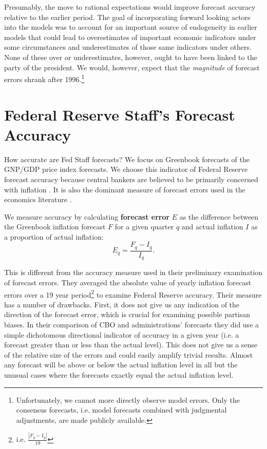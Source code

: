 \documentclass[a4paper]{article}\usepackage[]{graphicx}\usepackage[]{color}
\begin{document}
Presumably, the move to rational expectations would improve forecast accuracy relative to the earlier period. The goal of incorporating forward looking actors into the models was to account for an important source of endogeneity in earlier models that could lead to overestimates of important economic indicators under some circumstances and underestimates of those same indicators under others. None of these over or underestimates, however, ought to have been linked to the party of the president. We would, however, expect that the \emph{magnitude} of forecast errors shrank after 1996.\footnote{Unfortunately, we cannot more directly observe model errors. Only the consensus forecasts, i.e. model forecasts combined with judgmental adjustments, are made publicly available.}
 


\section{Federal Reserve Staff's Forecast Accuracy}\label{ForecastAcc}

How accurate are Fed Staff forecasts? We focus on Greenbook forecasts of the GNP/GDP price index forecasts. We choose this indicator of Federal Reserve forecast accuracy because central bankers are believed to be primarily concerned with inflation \citep[e.g.][]{Cukierman1992,Mukherjee2008,Tillmann2008}. It is also the dominant measure of forecast errors used in the economics literature \citep[c.f.][]{Romer2000}. 

We measure accuracy by calculating {\bf{forecast error}} $E$ as the difference between the Greenbook inflation forecast $F$ for a given quarter $q$ and actual inflation $I$ as a proportion of actual inflation:
%
\begin{equation}
    E_{q} = \frac{F_{q} - I_{q}}{I_{q}}.
\end{equation}

This is different from the accuracy measure \cite{Frendreis2000} used in their preliminary examination of forecast errors. They averaged the absolute value of yearly inflation forecast errors over a 19 year period\footnote{i.e. $\frac{|F_{y} - I_{y}|}{19}$} to examine Federal Reserve accuracy. Their measure has a number of drawbacks. First, it does not give us any indication of the direction of the forecast error, which is crucial for examining possible partisan biases. In their comparison of CBO and administrations' forecasts they did use a simple dichotomous directional indicator of accuracy in a given year (i.e. a forecast greater than or less than the actual level). This does not give us a sense of the relative size of the errors and could easily amplify trivial results. Almost any forecast will be above or below the actual inflation level in all but the unusual cases where the forecasts exactly equal the actual inflation level. 
\end{document}
